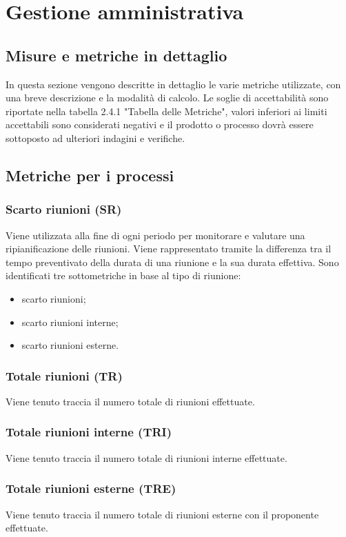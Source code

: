\section{Gestione amministrativa}
\subsection{Misure e metriche in dettaglio}
In questa sezione vengono descritte in dettaglio le varie metriche utilizzate, con una breve descrizione e la modalità di calcolo. 
Le soglie di accettabilità sono riportate nella tabella 2.4.1 "Tabella delle Metriche", valori inferiori ai limiti accettabili sono considerati negativi e il prodotto o processo dovrà essere sottoposto ad ulteriori indagini e verifiche.
\subsection{Metriche per i processi}
\subsubsection{Scarto riunioni (SR)}
Viene utilizzata alla fine di ogni periodo per monitorare e valutare una ripianificazione delle riunioni. Viene rappresentato tramite la differenza tra il tempo preventivato della durata di una riunione e la sua durata effettiva. Sono identificati tre sottometriche in base al tipo di riunione:
\begin{itemize}
    \item scarto riunioni;
    \item scarto riunioni interne;
    \item scarto riunioni esterne.
\end{itemize}

\subsubsection{Totale riunioni (TR)}
Viene tenuto traccia il numero totale di riunioni effettuate.
\subsubsection{Totale riunioni interne (TRI)}
Viene tenuto traccia il numero totale di riunioni interne effettuate.
\subsubsection{Totale riunioni esterne (TRE)}
Viene tenuto traccia il numero totale di riunioni esterne con il proponente effettuate.

